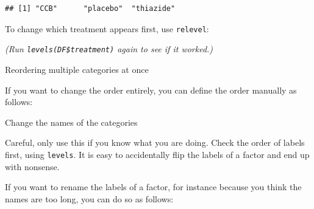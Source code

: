 \documentclass[
]{book}
\newenvironment{Shaded}{\begin{snugshade}}{\end{snugshade}}
\newcommand{\AttributeTok}[1]{\textcolor[rgb]{0.77,0.63,0.00}{#1}}
\newcommand{\CommentTok}[1]{\textcolor[rgb]{0.56,0.35,0.01}{\textit{#1}}}
\newcommand{\FunctionTok}[1]{\textcolor[rgb]{0.00,0.00,0.00}{#1}}
\newcommand{\NormalTok}[1]{#1}
\newcommand{\OtherTok}[1]{\textcolor[rgb]{0.56,0.35,0.01}{#1}}
\newcommand{\SpecialCharTok}[1]{\textcolor[rgb]{0.00,0.00,0.00}{#1}}
\newcommand{\StringTok}[1]{\textcolor[rgb]{0.31,0.60,0.02}{#1}}
\begin{document}
\begin{Shaded}
\end{Shaded}

\begin{verbatim}
## [1] "CCB"      "placebo"  "thiazide"
\end{verbatim}

To change which treatment appears first, use \texttt{relevel}:

\begin{Shaded}
\end{Shaded}

\emph{(Run \texttt{levels(DF\$treatment)} again to see if it worked.)}

Reordering multiple categories at once

If you want to change the order entirely, you can define the order manually as follows:

\begin{Shaded}
\end{Shaded}

Change the names of the categories

Careful, only use this if you know what you are doing. Check the order of labels first, using \texttt{levels}. It is easy to accidentally flip the labels of a factor and end up with nonsense.

If you want to rename the labels of a factor, for instance because you think the names are too long, you can do so as follows:

\begin{Shaded}
\end{Shaded}
\end{document}
